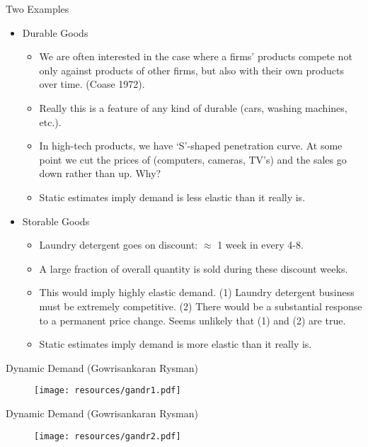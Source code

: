\begin{frame}{Two Examples}
\begin{itemize}
\item Durable Goods
\begin{itemize}
\item We are often interested in the case where a firms' products compete not only against products of other firms, but also with their own products over time. (Coase 1972).
\item Really this is a feature of any kind of durable (cars, washing machines, etc.).
\item In high-tech products, we have `S'-shaped penetration curve. At some point we cut the prices of (computers, cameras, TV's) and the sales go down rather than up. Why?
\item Static estimates imply demand is \alert{less elastic} than it really is.
\end{itemize}
\item Storable Goods
\begin{itemize}
\item Laundry detergent goes on discount: $\approx$ 1 week in every 4-8.
\item A large fraction of overall quantity is sold during these discount weeks.
\item This would imply highly elastic demand. (1) Laundry detergent business must be extremely competitive. (2) There would be a substantial response to a \alert{permanent} price change. Seems unlikely that (1) and (2) are true.
\item Static estimates imply demand is \alert{more elastic} than it really is.
\end{itemize}
\end{itemize}
\end{frame}

\begin{frame}{Dynamic Demand  (Gowrisankaran Rysman)}
\begin{figure}[htbp]
\begin{center}
\texttt{[image: resources/gandr1.pdf]}
\label{gandr1}
\end{center}
\end{figure}
\end{frame}

\begin{frame}{Dynamic Demand (Gowrisankaran Rysman)}
\begin{figure}[htbp]
\begin{center}
\texttt{[image: resources/gandr2.pdf]}
\label{gandr2}
\end{center}
\end{figure}
\end{frame}


